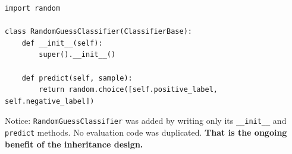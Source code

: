 \begin{verbatim}
import random

class RandomGuessClassifier(ClassifierBase):
    def __init__(self):
        super().__init__()

    def predict(self, sample):
        return random.choice([self.positive_label, self.negative_label])
\end{verbatim}

\noindent
Notice: \texttt{RandomGuessClassifier} was added by writing only its \texttt{\_\_init\_\_} and \texttt{predict} methods.
No evaluation code was duplicated.
\textbf{That is the ongoing benefit of the inheritance design.}

